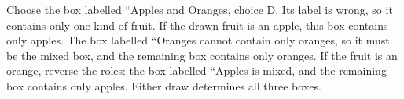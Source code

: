 Choose the box labelled ``Apples and Oranges, choice D. Its label is wrong, so it contains only one kind of fruit. If the drawn fruit is an apple, this box contains only apples. The box labelled ``Oranges cannot contain only oranges, so it must be the mixed box, and the remaining box contains only oranges. If the fruit is an orange, reverse the roles: the box labelled ``Apples is mixed, and the remaining box contains only apples. Either draw determines all three boxes.
